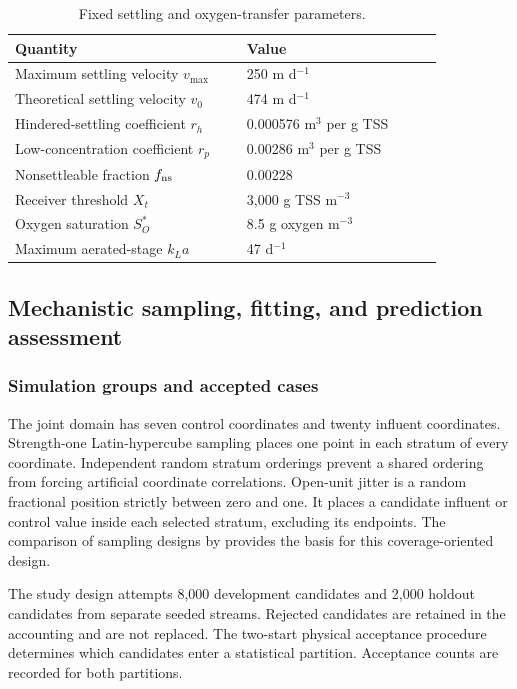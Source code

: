 \begin{table}[htbp]
\centering\small
\caption{Fixed settling and oxygen-transfer parameters.}
\label{tab:plant_settling_constants}
\begin{tabular}{p{0.46\linewidth}p{0.39\linewidth}}
\toprule Quantity & Value\\\midrule
Maximum settling velocity $v_{\max}$ & 250 m d$^{-1}$\\
Theoretical settling velocity $v_0$ & 474 m d$^{-1}$\\
Hindered-settling coefficient $r_h$ & 0.000576 m$^3$ per g TSS\\
Low-concentration coefficient $r_p$ & 0.00286 m$^3$ per g TSS\\
Nonsettleable fraction $f_{\rm ns}$ & 0.00228\\
Receiver threshold $X_t$ & 3{,}000 g TSS m$^{-3}$\\
Oxygen saturation $S_O^*$ & 8.5 g oxygen m$^{-3}$\\
Maximum aerated-stage $k_La$ & 47 d$^{-1}$\\
\bottomrule
\end{tabular}
\end{table}

\subsection{Mechanistic sampling, fitting, and prediction assessment}

\subsubsection{Simulation groups and accepted cases}

The joint domain has seven control coordinates and twenty influent coordinates. Strength-one Latin-hypercube sampling places one point in each stratum of every coordinate. Independent random stratum orderings prevent a shared ordering from forcing artificial coordinate correlations. Open-unit jitter is a random fractional position strictly between zero and one. It places a candidate influent or control value inside each selected stratum, excluding its endpoints. The comparison of sampling designs by \citet{McKay1979} provides the basis for this coverage-oriented design.

The study design attempts 8{,}000 development candidates and 2{,}000 holdout candidates from separate seeded streams. Rejected candidates are retained in the accounting and are not replaced. The two-start physical acceptance procedure determines which candidates enter a statistical partition. Acceptance counts are recorded for both partitions.

